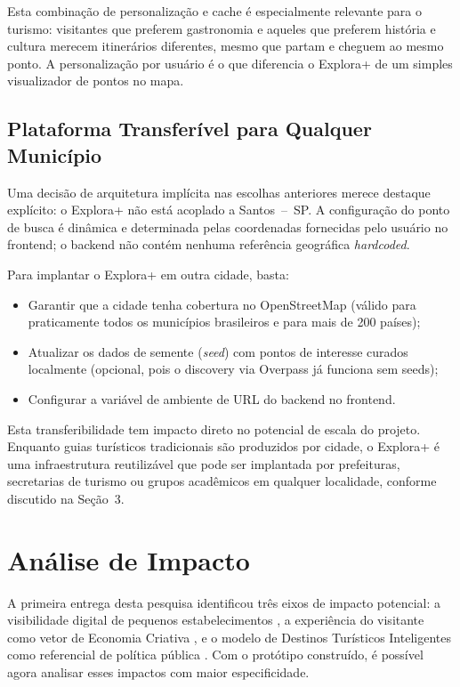 \documentclass[12pt, a4paper]{article}
\begin{document}
Esta combina\c{c}\~ao de personaliza\c{c}\~ao e cache \'e especialmente relevante para o turismo: visitantes que preferem gastronomia e aqueles que preferem hist\'oria e cultura merecem itiner\'arios diferentes, mesmo que partam e cheguem ao mesmo ponto. A personaliza\c{c}\~ao por usu\'ario \'e o que diferencia o Explora+ de um simples visualizador de pontos no mapa.

\subsection{Plataforma Transfer\'ivel para Qualquer Munic\'ipio}

Uma decis\~ao de arquitetura impl\'icita nas escolhas anteriores merece destaque expl\'icito: o Explora+ n\~ao est\'a acoplado a Santos~--~SP. A configura\c{c}\~ao do ponto de busca \'e din\^amica e determinada pelas coordenadas fornecidas pelo usu\'ario no frontend; o backend n\~ao cont\'em nenhuma refer\^encia geogr\'afica \emph{hardcoded}.

Para implantar o Explora+ em outra cidade, basta:
\begin{itemize}
  \item Garantir que a cidade tenha cobertura no OpenStreetMap (v\'alido para praticamente todos os munic\'ipios brasileiros e para mais de 200 pa\'ises);
  \item Atualizar os dados de semente (\textit{seed}) com pontos de interesse curados localmente (opcional, pois o discovery via Overpass j\'a funciona sem seeds);
  \item Configurar a vari\'avel de ambiente de URL do backend no frontend.
\end{itemize}

Esta transferibilidade tem impacto direto no potencial de escala do projeto. Enquanto guias tur\'isticos tradicionais s\~ao produzidos por cidade, o Explora+ \'e uma infraestrutura reutiliz\'avel que pode ser implantada por prefeituras, secretarias de turismo ou grupos acad\^emicos em qualquer localidade, conforme discutido na Se\c{c}\~ao~3.

\section{An\'alise de Impacto}

A primeira entrega desta pesquisa identificou tr\^es eixos de impacto potencial: a visibilidade digital de pequenos estabelecimentos \parencite{luca2022,shankar2025}, a experi\^encia do visitante como vetor de Economia Criativa \parencite{silva2020,melo2022}, e o modelo de Destinos Tur\'isticos Inteligentes como referencial de pol\'itica p\'ublica \parencite{brasil2022}. Com o prot\'otipo constru\'ido, \'e poss\'ivel agora analisar esses impactos com maior especificidade.
\end{document}
